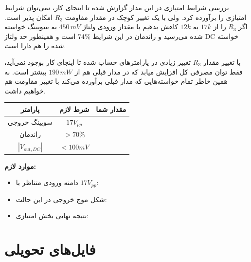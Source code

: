\documentclass[12pt,a4paper]{article}
\begin{document}
\begin{answerbox}{بررسی شرایط امتیازی}
	در این مدار گزارش شده تا اینجای کار، نمی‌توان شرایط امتیازی را برآورده کرد. ولی با یک تغییر کوچک در مقدار مقاومت $R_3$ امکان پذیر است. اگر $R_3$ را از $17k$ به $12k$ کاهش بدهیم با مقدار ورودی ولتاژ $450 \, mV$ به سویینگ خواسته شده می‌رسید و راندمان در این شرایط $74\%$ است و همینطور حد ولتاژ DC خواسته شده را هم دارا است. 
	
	با تغییر مقدار $R_3$ تغییر زیادی در پارامتر‌های حساب شده تا اینجای کار بوجود نمی‌آید، فقط توان مصرفی کل افزایش میابد که در مدار قبلی هم از $190 \, mW$ بیشتر است. به همین خاطر تمام خواسته‌هایی که مدار قبلی برآورده می‌کند با تغییر مقاومت هم خواهیم داشت. 
\begin{center}
\begin{tabular}{|c|c|c|}
\hline
\textbf{پارامتر} & \textbf{شرط لازم} & \textbf{مقدار شما} \\
\hline
سویینگ خروجی & $17V_{pp}$ & \\
\hline
راندمان & $>70\%$ & \\
\hline
$|V_{out,DC}|$ & $<100mV$ & \\
\hline
\end{tabular}
\end{center}

\vspace{1cm}

\textbf{موارد لازم:}
\begin{itemize}
    \item دامنه ورودی متناظر با $17V_{pp}$: \underline{\hspace{4cm}}
    \item شکل موج خروجی در این حالت: \underline{\hspace{4cm}}
    \item نتیجه نهایی بخش امتیازی: \underline{\hspace{4cm}}
\end{itemize}

\vspace{5cm}
\end{answerbox}

\newpage

\section{فایل‌های تحویلی}
\end{document}
